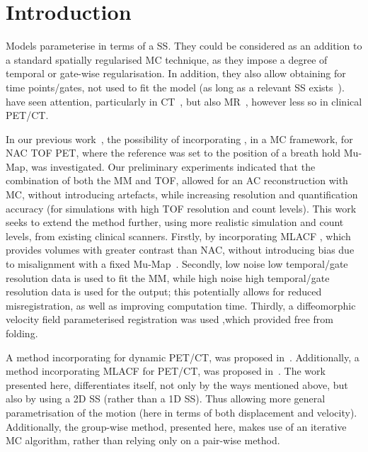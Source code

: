 \section{Introduction} \label{sec:introduction}
     Models parameterise  in terms of a \gls{SS}. They could be considered as an addition to a standard spatially regularised \gls{MC} technique, as they impose a degree of temporal or gate-wise regularisation. In addition, they also allow obtaining  for time points/gates, not used to fit the model (as long as a relevant \gls{SS} exists~\cite{McClelland2013}).  have seen attention, particularly in \acrshort{CT}~\cite{Li2007EnhancedModel}, but also \acrshort{MR}~\cite{Manke2002RespiratoryModels, Manber2016JointCorrection.}, however less so in clinical \acrshort{PET}/\acrshort{CT}.
    
    In our previous work~\cite{Whitehead2019ImpactPET, Whitehead2020PET/CTFields, Whitehead2021ComparisonMap}, the possibility of incorporating , in a \gls{MC} framework, for \gls{NAC} \gls{TOF} \acrshort{PET}, where the reference was set to the position of a breath hold \gls{Mu-Map}, was investigated. %
    Our preliminary experiments indicated that the combination of both the \gls{MM} and \gls{TOF}, allowed for an \gls{AC} reconstruction with \gls{MC}, without introducing artefacts, while increasing resolution and quantification accuracy (for simulations with high \gls{TOF} resolution and count levels). This work seeks to extend the method further, using more realistic simulation and count levels, from existing clinical scanners. Firstly, by incorporating \acrshort{MLACF}%
    , which provides volumes with greater contrast than \gls{NAC}, without introducing bias due to misalignment with a fixed \gls{Mu-Map}~\cite{Nuyts2012ML-reconstructionFactors}. Secondly, low noise low temporal/gate resolution data is used to fit the \gls{MM}, while high noise high temporal/gate resolution data is used for the output; this potentially allows for reduced misregistration, as well as improving computation time. Thirdly, a diffeomorphic velocity field parameterised registration was used ,which provided  free from folding.
    
    A method incorporating  for dynamic \acrshort{PET}/\acrshort{CT}, was proposed in~\cite{Chan2018Non-RigidPET}. Additionally, a method incorporating \acrshort{MLACF} for \acrshort{PET}/\acrshort{CT}, was proposed in~\cite{Lu2018RespiratoryData}. The work presented here, differentiates itself, not only by the ways mentioned above, but also by using a \acrshort{2D} \gls{SS} (rather than a \acrshort{1D} \gls{SS}). Thus allowing more general parametrisation of the motion (here in terms of both displacement and velocity). Additionally, the group-wise method, presented here, makes use of an iterative \gls{MC} algorithm, rather than relying only on a pair-wise method.

